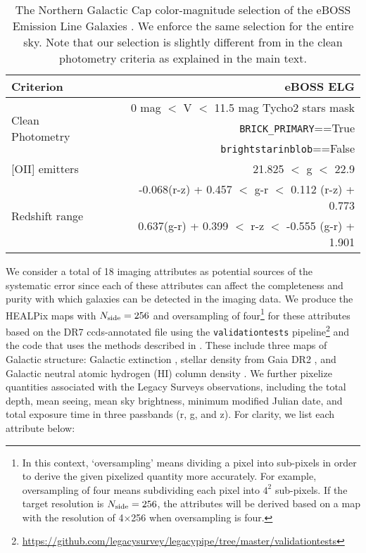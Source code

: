  
\begin{table}
  \begin{center}
    \caption{The Northern Galactic Cap color-magnitude selection of the eBOSS Emission Line Galaxies \citep{Raichoor2017MNRAS.471.3955R}. We enforce the same selection for the entire sky. Note that our selection is slightly different from \citet{Raichoor2017MNRAS.471.3955R} in the clean photometry criteria as explained in the main text.}
    \label{tab:ts}
    \begin{tabular}{l|r}
    \hline
    \hline
      \textbf{Criterion} & \textbf{eBOSS ELG}\\
      \hline
      \multirow{3}{*}{\scriptsize{Clean Photometry}} & \scriptsize{0 mag $<$ V $<$ 11.5 mag Tycho2 stars mask}\\
        & \scriptsize{\texttt{BRICK\_PRIMARY}==True}\\
        & \scriptsize{\texttt{brightstarinblob}==False} \\
     \hline
      \scriptsize{[OII] emitters} &  \scriptsize{21.825 $<$ g $<$ 22.9} \\
      \hline 
      \multirow{2}{*}{\scriptsize{Redshift range}} & \scriptsize{-0.068(r-z) + 0.457 $<$ g-r $<$ 0.112 (r-z) + 0.773}\\
 & \scriptsize{0.637(g-r) + 0.399 $<$ r-z $<$ -0.555 (g-r) + 1.901}\\
      \end{tabular}
  \end{center}
\end{table}

We consider a total of 18 imaging attributes as potential sources of the systematic error since each of these attributes can affect the completeness and purity with which galaxies can be detected in the imaging data. We produce the HEALPix maps \citep{gorski2005healpix} with $N_{{\rm side}}=256$ and oversampling of four\footnote{In this context, `oversampling' means dividing a pixel into sub-pixels in order to derive the given pixelized quantity more accurately. For example, oversampling of four means subdividing each pixel into $4^2$ sub-pixels. If the target resolution is $N_{{\rm side}}=256$, the attributes will be derived based on a map with the resolution of 4$\times$256 when oversampling is four.} for these attributes based on the DR7 ccds-annotated file using the \texttt{validationtests} pipeline\footnote{\url{https://github.com/legacysurvey/legacypipe/tree/master/validationtests}} and the code that uses the methods described in \citet{LeistedtMap}. These include three maps of Galactic structure: Galactic extinction \citep{schlegel1998maps}, stellar density from Gaia DR2 \citep{brown2018gaia}, and Galactic neutral atomic hydrogen (HI) column density \citep{bekhti2016hi4pi}. We further pixelize quantities associated with the Legacy Surveys observations, including the total depth, mean seeing, mean sky brightness, minimum modified Julian date, and total exposure time in three passbands (r, g, and z).  For clarity, we list each attribute below:\\





